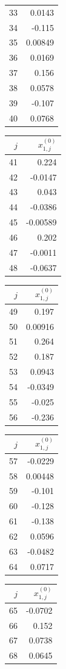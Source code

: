 {\begin{tabular}[t]{r|r}
33 & 0.0143 \\
34 & -0.115 \\
35 & 0.00849 \\
36 & 0.0169 \\
37 & 0.156 \\
38 & 0.0578 \\
39 & -0.107 \\
40 & 0.0768
\end{tabular}\kern4pt
\begin{tabular}[t]{r|r}
$j$ & $x^{(0)}_{1,j}$ \\\hline
41 & 0.224 \\
42 & -0.0147 \\
43 & 0.043 \\
44 & -0.0386 \\
45 & -0.00589 \\
46 & 0.202 \\
47 & -0.0011 \\
48 & -0.0637
\end{tabular}\kern4pt
\begin{tabular}[t]{r|r}
$j$ & $x^{(0)}_{1,j}$ \\\hline
49 & 0.197 \\
50 & 0.00916 \\
51 & 0.264 \\
52 & 0.187 \\
53 & 0.0943 \\
54 & -0.0349 \\
55 & -0.025 \\
56 & -0.236
\end{tabular}\kern4pt
\begin{tabular}[t]{r|r}
$j$ & $x^{(0)}_{1,j}$ \\\hline
57 & -0.0229 \\
58 & 0.00448 \\
59 & -0.101 \\
60 & -0.128 \\
61 & -0.138 \\
62 & 0.0596 \\
63 & -0.0482 \\
64 & 0.0717
\end{tabular}\kern4pt
\begin{tabular}[t]{r|r}
$j$ & $x^{(0)}_{1,j}$ \\\hline
65 & -0.0702 \\
66 & 0.152 \\
67 & 0.0738 \\
68 & 0.0645 \\

\end{tabular}}
